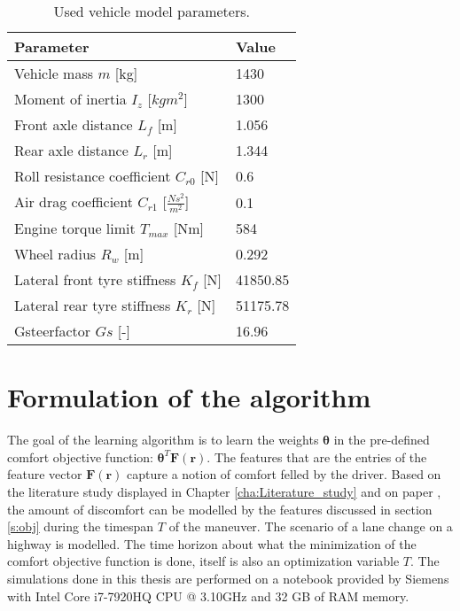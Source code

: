 \begin{table}[h]
	\centering
	\begin{tabular}{|p{5cm}|p{2cm}|}
		\hline
		\textbf{Parameter} & \textbf{Value}\\ \hline		
		Vehicle mass $m$ [kg] & 1430\\ \hline
		Moment of inertia $I_z$ [$kgm^2$] & 1300\\ \hline
		Front axle distance $L_f$ [m] & 1.056\\ \hline
		Rear axle distance $L_r$ [m] & 1.344\\ \hline
		Roll resistance coefficient $C_{r0}$ [N] & 0.6\\ \hline
		Air drag coefficient $C_{r1}$ [$\frac{Ns^2}{m^2}$] & 0.1\\ \hline
		Engine torque limit $T_{max}$ [Nm] & 584\\ \hline
		Wheel radius $R_w$ [m] & 0.292\\ \hline
		Lateral front tyre stiffness $K_{f}$ [N] & 41850.85\\ \hline
		Lateral rear tyre stiffness $K_{r}$ [N] & 51175.78\\ \hline
		Gsteerfactor $Gs$ [-] &16.96 \\ \hline
		
	\end{tabular}
	\caption{Used vehicle model parameters.}
	\label{table:vehicel_model_param}
\end{table}
\newpage
\section{Formulation of the algorithm} 
\label{s:learning_alg}
The goal of the learning algorithm is to learn the weights $\bm{\theta}$ in the pre-defined comfort objective function: $\bm{\theta}^T\bm{F}(\bm{r})$. The features that are the entries of the feature vector $\bm{F}(\bm{r})$ capture a notion of comfort felled by the driver. Based on the literature study displayed in Chapter \ref{cha:Literature_study} and on paper \cite{Kuderer2015a}, the amount of discomfort can be modelled by the features discussed in section \ref{s:obj} during the timespan $T$ of the maneuver. The scenario of a lane change on a highway is modelled. The time horizon about what the minimization of the comfort objective function is done, itself is also an optimization variable  $T$. The simulations done in this thesis are performed on a notebook provided by Siemens with Intel Core i7-7920HQ CPU @ 3.10GHz and 32 GB of RAM memory.\\


